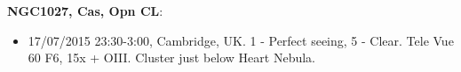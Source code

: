 {\bf NGC1027, Cas, Opn CL}:
\begin{itemize}
\item 17/07/2015 23:30-3:00, Cambridge, UK. 1 - Perfect seeing, 5 - Clear. Tele Vue 60 F6, 15x + OIII. Cluster just below Heart Nebula.
\end{itemize}

